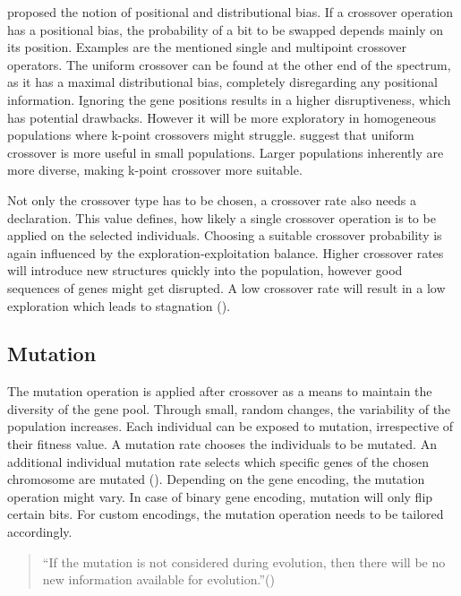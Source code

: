 \cite{srinivas_genetic_1994} proposed the notion of positional and distributional bias. If a crossover operation has a positional bias, the probability of a bit to be swapped depends mainly on its position. Examples are the mentioned single and multipoint crossover operators. The uniform crossover can be found at the other end of the spectrum, as it has a maximal distributional bias, completely disregarding any positional information. Ignoring the gene positions results in a higher disruptiveness, which has potential drawbacks. However it will be more exploratory in homogeneous populations where k-point crossovers might struggle. \cite{srinivas_genetic_1994} suggest that uniform crossover is more useful in small populations. Larger populations inherently are more diverse, making k-point crossover more suitable.

Not only the crossover type has to be chosen, a crossover rate also needs a declaration. This value defines, how likely a single crossover operation is to be applied on the selected individuals.
Choosing a suitable crossover probability is again influenced by the exploration-exploitation balance. Higher crossover rates will introduce new structures quickly into the population, however good sequences of genes might get disrupted. A low crossover rate will result in a low exploration which leads to stagnation (\cite{grefenstette_optimization_1986}).

\subsection{Mutation}
The mutation operation is applied after crossover as a means to maintain the diversity of the gene pool. Through small, random changes, the variability of the population increases. Each individual can be exposed to mutation, irrespective of their fitness value.
A mutation rate chooses the individuals to be mutated. An additional individual mutation rate selects which specific genes of the chosen chromosome are mutated (\cite{srinivas_genetic_1994}). Depending on the gene encoding, the mutation operation might vary. In case of binary gene encoding, mutation will only flip certain bits. For custom encodings, the mutation operation needs to be tailored accordingly.

\begin{quote}
	\begin{em}
		\enquote{If the mutation is not considered during evolution, then there will be no new information available for evolution.}(\cite{katoch_review_2021})
	\end{em}
\end{quote}

